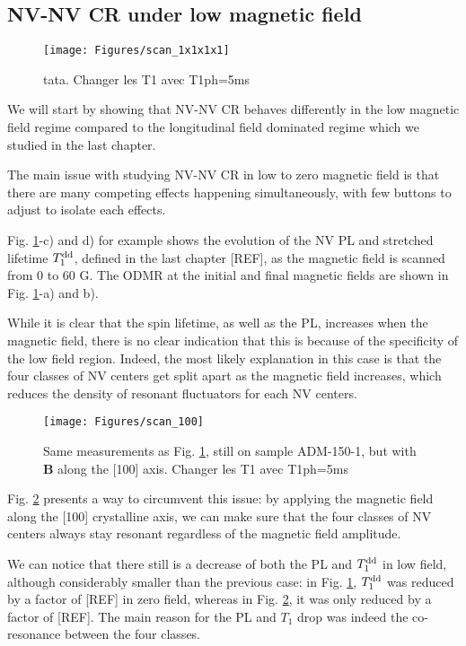\documentclass[a4paper,11pt]{report}
\begin{document}
\subsection{NV-NV CR under low magnetic field}
\begin{figure}[h]
\centering
\texttt{[image: Figures/scan\_1x1x1x1]}
\caption{tata. Changer les T1 avec T1ph=5ms}
\label{scan 1x1x1x1}
\end{figure}
We will start by showing that NV-NV CR behaves differently in the low magnetic field regime compared to the longitudinal field dominated regime which we studied in the last chapter.

The main issue with studying NV-NV CR in low to zero magnetic field is that there are many competing effects happening simultaneously, with few buttons to adjust to isolate each effects.

Fig. \ref{scan 1x1x1x1}-c) and d) for example shows the evolution of the NV PL and stretched lifetime $T_1^{\rm dd}$, defined in the last chapter [REF], as the magnetic field is scanned from 0 to 60 G. The ODMR at the initial and final magnetic fields are shown in Fig. \ref{scan 1x1x1x1}-a) and b).

While it is clear that the spin lifetime, as well as the PL, increases when the magnetic field, there is no clear indication that this is because of the specificity of the low field region. Indeed, the most likely explanation in this case is that the four classes of NV centers get split apart as the magnetic field increases, which reduces the density of resonant fluctuators for each NV centers.

\begin{figure}[h]
\centering
\texttt{[image: Figures/scan\_100]}
\caption{Same measurements as Fig. \ref{scan 1x1x1x1}, still on sample ADM-150-1, but with $\mathbf{B}$ along the [100] axis. Changer les T1 avec T1ph=5ms}
\label{scan 100}
\end{figure}

Fig. \ref{scan 100} presents a way to circumvent this issue: by applying the magnetic field along the [100] crystalline axis, we can make sure that the four classes of NV centers always stay resonant regardless of the magnetic field amplitude.

We can notice that there still is a decrease of both the PL and $T_1^{\rm dd}$ in low field, although considerably smaller than the previous case: in Fig. \ref{scan 1x1x1x1}, $T_1^{\rm dd}$ was reduced by a factor of [REF] in zero field, whereas in Fig. \ref{scan 100}, it was only reduced by a factor of [REF]. The main reason for the PL and $T_1$ drop was indeed the co-resonance between the four classes.
\end{document}
